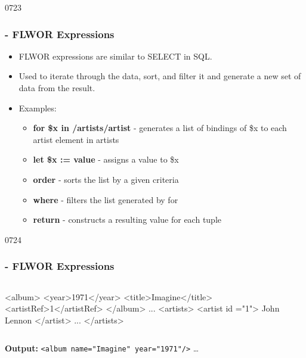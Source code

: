 
\begin{slide}[fragile]{0723}
\frametitle{ - FLWOR Expressions}
\begin{itemize}
\item FLWOR expressions are similar to SELECT in SQL.
\item Used to iterate through the data, sort, and filter it and generate a new set of data from the result.
\item Examples:
\begin{itemize}
\item \textbf{for \$x in /artists/artist} - generates a list of bindings of \$x to each artist element in artists
\item \textbf{let \$x := value} - assigns a value to \$x
\item \textbf{order} - sorts the list by a given criteria
\item \textbf{where} - filters the list generated by for
\item \textbf{return} - constructs a resulting value for each tuple
\end{itemize}
\end{itemize}
\end{slide}


\begin{slide}[fragile]{0724}
\frametitle{ - FLWOR Expressions}
\begin{columns}
\begin{column}{40mm}
\begin{xml}
<album>
 <year>1971</year>
 <title>Imagine</title>
 <artistRef>1</artistRef>
</album>
...
<artists>
  <artist id ="1">
    John Lennon
  </artist>
 ...
</artists>  
\end{xml}        
\end{column}
\begin{column}{60mm}

\end{column}
\end{columns}
\medskip
\textbf{Output:} \verb!<album name="Imagine" year="1971"/>! \ldots
\end{slide}



